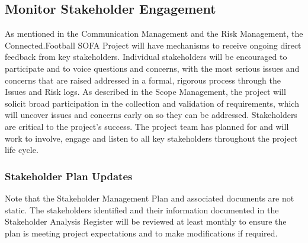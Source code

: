 \subsection{Monitor Stakeholder Engagement}
As mentioned in the Communication Management and the Risk Management, the Connected.Football SOFA Project will have mechanisms to receive ongoing direct feedback from key stakeholders. Individual stakeholders will be encouraged to participate and to voice questions and concerns, with the most serious issues and concerns that are raised addressed in a formal, rigorous process through the Issues and Risk logs.
\newline
\newline
As described in the Scope Management, the project will solicit broad participation in the collection and validation of requirements, which will uncover issues and concerns early on so they can be addressed.
Stakeholders are critical to the project’s success.  The project team has planned for and will work to involve, engage and listen to all key stakeholders throughout the project life cycle.

\subsubsection{Stakeholder Plan Updates}
Note that the Stakeholder Management Plan and associated documents are not static.  The stakeholders identified and their information documented in the Stakeholder Analysis Register will be reviewed at least monthly to ensure the plan is meeting project expectations and to make modifications if required.